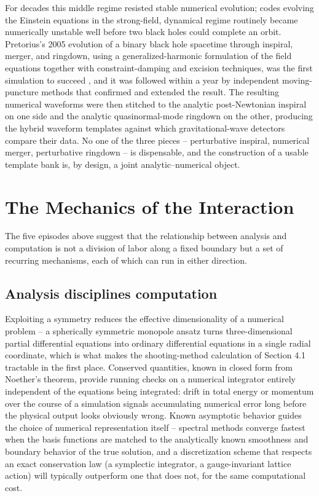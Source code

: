For decades this middle regime resisted stable numerical evolution; codes
evolving the Einstein equations in the strong-field, dynamical regime routinely
became numerically unstable well before two black holes could complete an
orbit. Pretorius's 2005 evolution of a binary black hole spacetime through
inspiral, merger, and ringdown, using a generalized-harmonic formulation of the
field equations together with constraint-damping and excision techniques, was
the first simulation to succeed \cite{Pretorius2005}, and it was followed
within a year by independent moving-puncture methods that confirmed and
extended the result. The resulting numerical waveforms were then stitched to
the analytic post-Newtonian inspiral on one side and the analytic
quasinormal-mode ringdown on the other, producing the hybrid waveform templates
against which gravitational-wave detectors compare their data. No one of the
three pieces -- perturbative inspiral, numerical merger, perturbative ringdown
-- is dispensable, and the construction of a usable template bank is, by
design, a joint analytic--numerical object.

\section{The Mechanics of the Interaction}

The five episodes above suggest that the relationship between analysis and
computation is not a division of labor along a fixed boundary but a set of
recurring mechanisms, each of which can run in either direction.

\subsection{Analysis disciplines computation}

Exploiting a symmetry reduces the effective dimensionality of a numerical
problem -- a spherically symmetric monopole ansatz turns three-dimensional
partial differential equations into ordinary differential equations in a single
radial coordinate, which is what makes the shooting-method calculation of
Section 4.1 tractable in the first place. Conserved quantities, known in closed
form from Noether's theorem, provide running checks on a numerical integrator
entirely independent of the equations being integrated: drift in total energy
or momentum over the course of a simulation signals accumulating numerical
error long before the physical output looks obviously wrong. Known asymptotic
behavior guides the choice of numerical representation itself -- spectral
methods converge fastest when the basis functions are matched to the
analytically known smoothness and boundary behavior of the true solution, and a
discretization scheme that respects an exact conservation law (a symplectic
integrator, a gauge-invariant lattice action) will typically outperform one
that does not, for the same computational cost.

